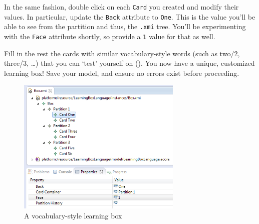 \begin{stepbystep}
\item In the same fashion, double click on each \texttt{Card} you created and modify their values. In particular, update the
\texttt{Back} attribute to \texttt{One}. This is the value you'll be able to see from the partition and thus, the \texttt{.xmi} tree. You'll be experimenting
with the \texttt{Face} attribute shortly, so provide a \texttt{1} value for that as well.

\item Fill in the rest the cards with similar vocabulary-style words (such as two/2, three/3, \ldots) that you can `test' yourself on
(). You now have a unique, customized learning box! Save your model, and ensure no errors exist before proceeding.

\begin{figure}[htbp]
	\centering
  \includegraphics[width=0.7\textwidth]{../../org.moflon.doc.handbook.02_leitnersLearningBox/3_creatingInstance/04_images/eclipse_finalBoxXMI}
	\caption{A vocabulary-style learning box}
	\label{eclipse:finalXMI}
\end{figure}

\end{stepbystep}
